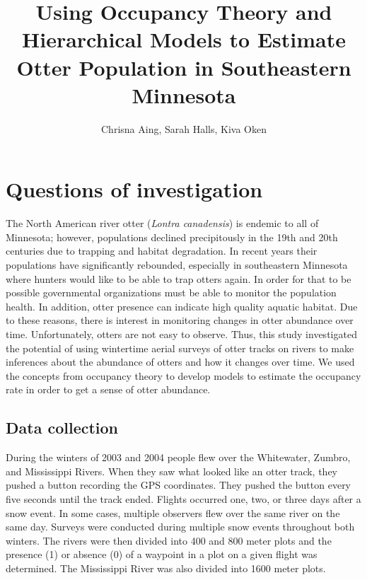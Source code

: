 \documentclass[12pt]{article}
\begin{document}
\title{Using Occupancy Theory and Hierarchical Models to Estimate Otter
Population in Southeastern Minnesota}
\date{}
\author{Chrisna Aing, Sarah Halls, Kiva Oken}
\maketitle

\section{Questions of investigation}
The North American river otter (\textit{Lontra canadensis}) is endemic to all of
Minnesota; however, populations declined precipitously in the 19th and 20th
centuries due to trapping and habitat degradation. In recent years their
populations have significantly rebounded, especially in southeastern Minnesota
where hunters would like to be able to trap otters again. In order for that to
be possible governmental organizations must be able to monitor the population
health. In addition, otter presence can indicate high quality aquatic habitat.
Due to these reasons, there is interest in monitoring changes in otter abundance
over time. Unfortunately, otters are not easy to observe. Thus, this study
investigated the potential of using wintertime aerial surveys of otter tracks on
rivers to make inferences about the abundance of otters and how it changes over
time. We used the concepts from occupancy theory to develop models to estimate
the occupancy rate in order to get a sense of otter abundance.

    \subsection{Data collection}
    During the winters of 2003 and 2004 people flew over the Whitewater, Zumbro,
    and Mississippi Rivers. When they saw what looked like an otter track, they
    pushed a button recording the GPS coordinates. They pushed the button every
    five seconds until the track ended. Flights occurred one, two, or three days
    after a snow event. In some cases, multiple observers flew over the same
    river on the same day. Surveys were conducted during multiple snow events
    throughout both winters. The rivers were then divided into 400 and 800 meter
    plots and the presence (1) or absence (0) of a waypoint in a plot on a given
    flight was determined. The Mississippi River was also divided into 1600
    meter plots.
\end{document}
